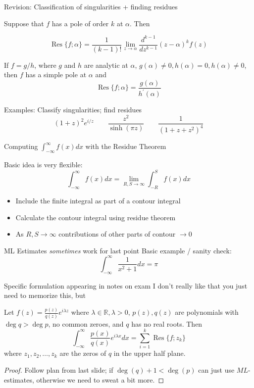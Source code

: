 \documentclass{beamer}
\newcommand{\R}{\mathbb{R}}
\DeclareMathOperator{\Res}{Res}
\begin{document}
\begin{frame}{Revision: Classification of singularities + finding residues}
\begin{theorem}
Suppose that $f$ has a pole of order $k$ at $\alpha$.  Then

$$\Res\{f;\alpha\}=\frac{1}{(k-1)!}\lim_{z\to\alpha} \frac{d^{k-1}}{dz^{k-1}} (z-\alpha)^kf(z)$$
\end{theorem}
\begin{corollary}
If $f=g/h$, where $g$ and $h$ are analytic at $\alpha$, $g(\alpha)\neq 0, h(\alpha)=0, h(\alpha)\neq 0$, then $f$ has a simple pole at $\alpha$ and
$$\Res\{f;\alpha\}=\frac{g(\alpha)}{h^\prime(\alpha)}$$
\end{corollary}
\begin{block}{Examples: Classify singularities; find residues}
$$(1+z)^2e^{i/z} \qquad \frac{z^2}{\sinh(\pi z)} \qquad \frac{1}{(1+z+z^2)^4}$$
\end{block}
\end{frame}
\begin{frame}{Computing $\int_{-\infty}^\infty f(x)dx$ with the Residue Theorem}

\begin{block}{Basic idea is very flexible:}
$$\int_{-\infty}^\infty f(x)dx=\lim_{R,S\to\infty}\int_{-R}^S f(x)dx$$
\begin{itemize}
    \item  Include the finite integral as part of a contour integral
    \item Calculate the contour integral using residue theorem
    \item As $R,S\to\infty$ contributions of other parts of contour $\to 0$
    \end{itemize}
\end{block}
\begin{block}{ML Estimates \emph{sometimes}  work for last point}
Basic example / sanity check: 
$$\int_{-\infty}^\infty \frac{1}{x^2+1}dx=\pi$$
\end{block}
\end{frame}

\begin{frame}{Specific formulation appearing in notes on exam}
I don't really like that you just need to memorize this, but \Sey[2][yellow]
\begin{theorem}
Let $f(z)=\frac{p(z)}{q(z)}e^{i\lambda z}$
where $\lambda\in\R, \lambda>0$, $p(z),q(z)$ are polynomials with $\deg q>\deg p$, no common zeroes, and $q$ has no real roots.  Then
$$\int_{-\infty}^\infty \frac{p(x)}{q(x)} e^{i\lambda x} dx=\sum_{i=1}^k\Res\{f;z_k\}$$
where $z_1, z_2,\dots, z_k$ are the zeros of $q$ in the upper half plane.
\end{theorem}
\begin{proof}
Follow plan from last slide; if $\deg(q)+1<\deg(p)$ can just use $ML$-estimates, otherwise we need to sweat a bit more.
\end{proof}


\end{frame}
\end{document}
